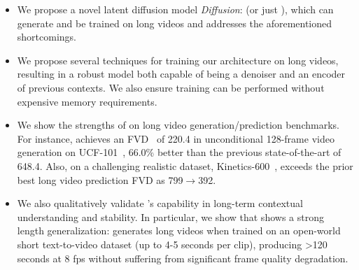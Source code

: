 \vspace{0.02in}

\begin{itemize}[leftmargin=*,itemsep=0mm]
    \item We propose a novel latent diffusion model \emph{\sname Diffusion}: \lname (or just \sname), which can generate and be trained on long videos and addresses the aforementioned shortcomings. 
    \item We propose several techniques for training our architecture on long videos, resulting in a robust model both capable of being a denoiser and an encoder of previous contexts. We also ensure training can be performed without expensive memory requirements.
    \item We show the strengths of \sname 
    on long video generation/prediction benchmarks. For instance, \sname achieves an FVD~\citep{unterthiner2018towards} of 220.4 in unconditional 128-frame video generation on UCF-101~\citep{soomro2012ucf101}, 66.0\% better than the previous state-of-the-art of 648.4. Also, on a challenging realistic dataset, Kinetics-600~\citep{kay2017kinetics}, \sname exceeds the prior best long video prediction FVD as 799$\to$392. 
    \item We also qualitatively validate \sname's capability in long-term contextual understanding and stability.
    In particular, we show that \sname shows a strong length generalization: \sname generates long videos when trained on an open-world short text-to-video dataset (up to 4-5 seconds 
    per clip), producing >120 seconds at 8 fps without suffering from significant frame quality degradation.
\end{itemize}
